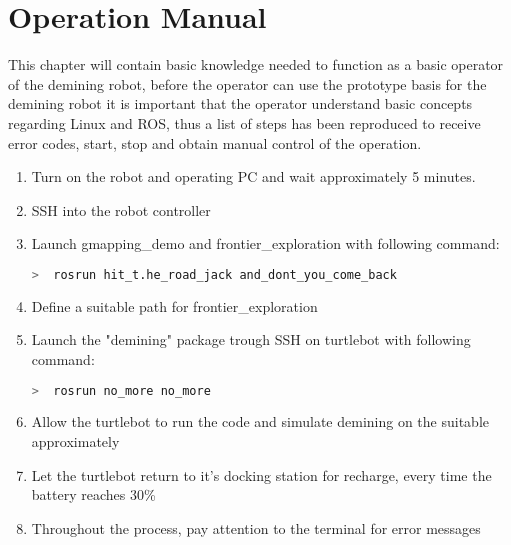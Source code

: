 \chapter{Operation Manual}

This chapter will contain basic knowledge needed to function as a basic operator of the demining robot, before the operator can use the prototype basis for the demining robot it is important that the operator understand basic concepts regarding Linux and ROS, thus a list of steps has been reproduced to receive error codes, start, stop and obtain manual control of the operation.

\begin{enumerate}
    \item Turn on the robot and operating PC and wait approximately 5 minutes.
    \item SSH into the robot controller
    \item Launch gmapping\_demo and frontier\_exploration with following command:\\
        \begin{lstlisting}[language=bash,numbers=none]
  >  rosrun hit_t.he_road_jack and_dont_you_come_back  
        \end{lstlisting}
    \item Define a suitable path for frontier\_exploration
    \item Launch the "demining" package trough SSH on turtlebot with following command:\\
        \begin{lstlisting}[language=bash,numbers=none]
  >  rosrun no_more no_more
        \end{lstlisting}
    \item Allow the turtlebot to run the code and simulate demining on the suitable approximately
    \item Let the turtlebot return to it's docking station for recharge, every time the battery reaches 30\%
    \item Throughout the process, pay attention to the terminal for error messages
\end{enumerate}